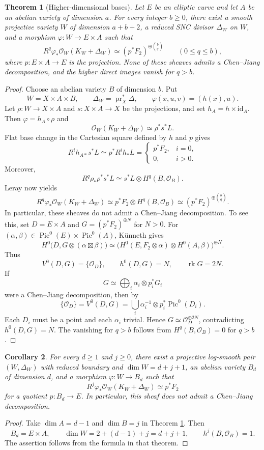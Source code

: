 \documentclass[10pt,a4paper]{amsart}
\newtheorem{theorem}{Theorem}[section]
\newtheorem{corollary}[theorem]{Corollary}
\newcommand{\OO}{\mathcal O}
\DeclareMathOperator{\Pic}{Pic}
\DeclareMathOperator{\pr}{pr}
\DeclareMathOperator{\rk}{rk}
\begin{document}
\begin{theorem}[Higher-dimensional bases]\label{thm:base}
Let $E$ be an elliptic curve and let $A$ be an abelian variety of dimension $a$. For every integer $b\ge0$, there exist a smooth projective variety $W$ of dimension $a+b+2$, a reduced SNC divisor $\Delta_W$ on $W$, and a morphism $\varphi:W\to E\times A$ such that
\[
R^q\varphi_*\OO_W(K_W+\Delta_W)\simeq(p^*F_2)^{\oplus\binom bq}\qquad(0\le q\le b),
\]
where $p:E\times A\to E$ is the projection. None of these sheaves admits a Chen--Jiang decomposition, and the higher direct images vanish for $q>b$.
\end{theorem}
\begin{proof}
Choose an abelian variety $B$ of dimension $b$. Put
\[
W=X\times A\times B,\qquad\Delta_W=\pr_X^*\Delta,
\qquad\varphi(x,u,v)=(h(x),u).
\]
Let $\rho:W\to X\times A$ and $s:X\times A\to X$ be the projections, and set $h_A=h\times\mathrm{id}_A$. Then $\varphi=h_A\circ\rho$ and
\[
\OO_W(K_W+\Delta_W)\simeq\rho^*s^*L.
\]
Flat base change in the Cartesian square defined by $h$ and $p$ gives
\[
R^ih_{A*}s^*L\simeq p^*R^ih_*L=
\begin{cases}p^*F_2,&i=0,\\0,&i>0.\end{cases}
\]
Moreover,
\[
R^q\rho_*\rho^*s^*L\simeq s^*L\otimes H^q(B,\OO_B).
\]
Leray now yields
\[
R^q\varphi_*\OO_W(K_W+\Delta_W)
\simeq p^*F_2\otimes H^q(B,\OO_B)
\simeq(p^*F_2)^{\oplus\binom bq}.
\]
In particular, these sheaves do not admit a Chen--Jiang decomposition. To see this, set $D=E\times A$ and $G=(p^*F_2)^{\oplus N}$ for $N>0$. For $(\alpha,\beta)\in\Pic^0(E)\times\Pic^0(A)$, K\"unneth gives
\[
H^0\bigl(D,G\otimes(\alpha\boxtimes\beta)\bigr)
\simeq\bigl(H^0(E,F_2\otimes\alpha)\otimes H^0(A,\beta)\bigr)^{\oplus N}.
\]
Thus
\[
V^0(D,G)=\{\OO_D\},\qquad h^0(D,G)=N,\qquad\rk G=2N.
\]
If
\[
G\simeq\bigoplus_i\alpha_i\otimes p_i^*G_i
\]
were a Chen--Jiang decomposition, then by \cite[Lemma 3.3]{LPS}
\[
\{\OO_D\}=V^0(D,G)=\bigcup_i\alpha_i^{-1}\otimes p_i^*\Pic^0(D_i).
\]
Each $D_i$ must be a point and each $\alpha_i$ trivial. Hence $G\simeq\OO_D^{\oplus2N}$, contradicting $h^0(D,G)=N$. The vanishing for $q>b$ follows from $H^q(B,\OO_B)=0$ for $q>b$.
\end{proof}

\begin{corollary}\label{cor:all}
For every $d\ge1$ and $j\ge0$, there exist a projective log-smooth pair $(W,\Delta_W)$ with reduced boundary and $\dim W=d+j+1$, an abelian variety $B_d$ of dimension $d$, and a morphism $\varphi:W\to B_d$ such that
\[
R^j\varphi_*\OO_W(K_W+\Delta_W)\simeq p^*F_2
\]
for a quotient $p:B_d\to E$. In particular, this sheaf does not admit a Chen--Jiang decomposition.
\end{corollary}
\begin{proof}
Take $\dim A=d-1$ and $\dim B=j$ in Theorem \ref{thm:base}. Then
\[
B_d=E\times A,\qquad\dim W=2+(d-1)+j=d+j+1,\qquad h^j(B,\OO_B)=1.
\]
The assertion follows from the formula in that theorem.
\end{proof}
\end{document}
